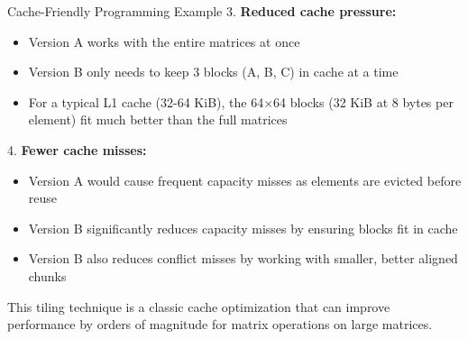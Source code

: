\begin{example2}{Cache-Friendly Programming Example}
3. \textbf{Reduced cache pressure:}
   \begin{itemize}
     \item Version A works with the entire matrices at once
     \item Version B only needs to keep 3 blocks (A, B, C) in cache at a time
     \item For a typical L1 cache (32-64 KiB), the 64×64 blocks (32 KiB at 8 bytes per element) fit much better than the full matrices
   \end{itemize}

4. \textbf{Fewer cache misses:}
   \begin{itemize}
     \item Version A would cause frequent capacity misses as elements are evicted before reuse
     \item Version B significantly reduces capacity misses by ensuring blocks fit in cache
     \item Version B also reduces conflict misses by working with smaller, better aligned chunks
   \end{itemize}

This tiling technique is a classic cache optimization that can improve performance by orders of magnitude for matrix operations on large matrices.
\end{example2}